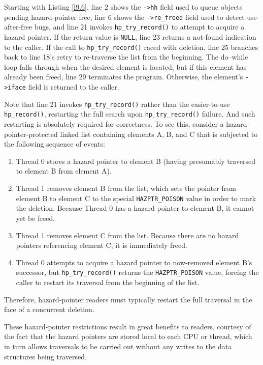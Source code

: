 \documentclass[11pt]{article}
\begin{document}
Starting with Listing \ref{l9.6}, line 2 shows the \texttt{->hh} field used to queue objects pending
hazard-pointer free, line 6 shows the \texttt{->re\_freed} field used to detect use-after-free bugs, and line 21
invokes \texttt{hp\_try\_record()} to attempt to acquire a hazard pointer. If the return value is \texttt{NULL}, line 23
returns a not-found indication to the caller. If the call to \texttt{hp\_try\_record()} raced with deletion, line
25 branches back to line 18’s retry to re-traverse the list from the beginning. The do–while loop
falls through when the desired element is located, but if this element has already been freed, line 29
terminates the program. Otherwise, the element’s \texttt{->iface} field is returned to the caller.

Note that line 21 invokes \texttt{hp\_try\_record()} rather than the easier-to-use \texttt{hp\_record()}, restarting the
full search upon \texttt{hp\_try\_record()} failure. And such restarting is absolutely required for correctness.
To see this, consider a hazard-pointer-protected linked list containing elements A, B, and C that is
subjected to the following sequence of events:
\begin{enumerate}
\item Thread 0 stores a hazard pointer to element B (having presumably traversed to element B from element A).
\item Thread 1 removes element B from the list, which sets the pointer from element B to element C to the
special \texttt{HAZPTR\_POISON} value in order to mark the deletion. Because Thread 0 has a hazard pointer to
element B, it cannot yet be freed.
\item Thread 1 removes element C from the list. Because there are no hazard pointers referencing element
C, it is immediately freed.
\item Thread 0 attempts to acquire a hazard pointer to now-removed element B’s successor, but
\texttt{hp\_try\_record()} returns the \texttt{HAZPTR\_POISON} value, forcing the caller to restart its traversal from
the beginning of the list.
\end{enumerate}

Therefore, hazard-pointer readers must typically restart the full traversal in the face of a
concurrent deletion.

These hazard-pointer restrictions result in great benefits to readers, courtesy of the fact that the
hazard pointers are stored local to each CPU or thread, which in turn allows traversals to be carried
out without any writes to the data structures being traversed.
\end{document}
